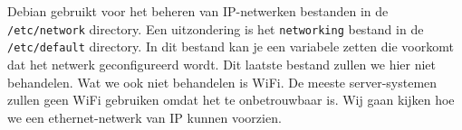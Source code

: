 Debian gebruikt voor het beheren van IP-netwerken bestanden in de \texttt{/etc/network} directory. Een uitzondering is het \texttt{networking} bestand in de \texttt{/etc/default} directory. In dit bestand kan je een variabele zetten die voorkomt dat het netwerk geconfigureerd wordt. Dit laatste bestand zullen we hier niet behandelen. Wat we ook niet behandelen is WiFi. De meeste server-systemen zullen geen WiFi gebruiken omdat het te onbetrouwbaar is. Wij gaan kijken hoe we een ethernet-netwerk van IP kunnen voorzien.

